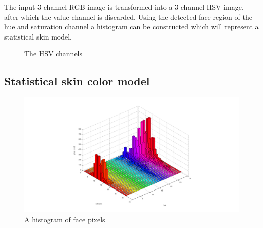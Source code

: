 The input 3 channel RGB image is transformed into a 3 channel HSV image, after which the value channel is discarded. Using the detected face region of the hue and saturation channel a histogram can be constructed which will represent a statistical skin model.

\begin{figure}[htbp]
  \centering
{}
\hspace{0.03\linewidth}
\hspace{0.03\linewidth}
  \caption{The HSV channels}
  \label{fig:hsvchannels}
\end{figure}





\subsection*{Statistical skin color model}

\begin{figure}[htbp]
    \center{}
    \includegraphics[width=1\textwidth]{figures/pipeline/histogram.png}
	\caption{A histogram of face pixels}
	\label{fig:histogram}
\end{figure}

